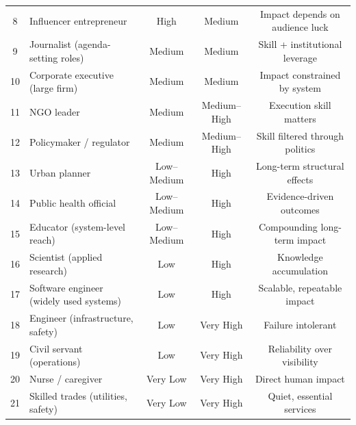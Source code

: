 \begin{table}[H]
\begin{tabular}{clccc}
    8                      & Influencer entrepreneur                 & High                & Medium             & Impact depends on audience luck   \\
    9                      & Journalist (agenda-setting roles)       & Medium              & Medium             & Skill + institutional leverage    \\
    10                     & Corporate executive (large firm)        & Medium              & Medium             & Impact constrained by system      \\
    11                     & NGO leader                              & Medium              & Medium--High       & Execution skill matters           \\
    12                     & Policymaker / regulator                 & Medium              & Medium--High       & Skill filtered through politics   \\
    13                     & Urban planner                           & Low--Medium         & High               & Long-term structural effects      \\
    14                     & Public health official                  & Low--Medium         & High               & Evidence-driven outcomes          \\
    15                     & Educator (system-level reach)           & Low--Medium         & High               & Compounding long-term impact      \\
    16                     & Scientist (applied research)            & Low                 & High               & Knowledge accumulation            \\
    17                     & Software engineer (widely used systems) & Low                 & High               & Scalable, repeatable impact       \\
    18                     & Engineer (infrastructure, safety)       & Low                 & Very High          & Failure intolerant                \\
    19                     & Civil servant (operations)              & Low                 & Very High          & Reliability over visibility       \\
    20                     & Nurse / caregiver                       & Very Low            & Very High          & Direct human impact               \\
    21                     & Skilled trades (utilities, safety)      & Very Low            & Very High          & Quiet, essential services         \\

\end{tabular}
\end{table}
